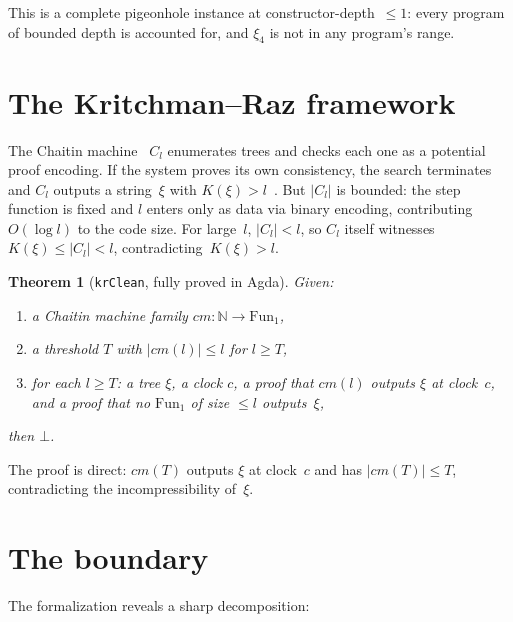 \documentclass[11pt]{article}
\newtheorem{theorem}{Theorem}
\begin{document}
This is a complete pigeonhole instance at constructor-depth~$\le 1$:
every program of bounded depth is accounted for,
and $\xi_4$ is not in any program's range.

\section{The Kritchman--Raz framework}

The Chaitin machine~\cite{chaitin1974} $C_l$ enumerates trees and
checks each one as a potential proof encoding.
If the system proves its own consistency, the search terminates
and $C_l$ outputs a string~$\xi$ with
$K(\xi) > l$~\cite{kolmogorov1965}.
But $|C_l|$ is bounded: the step function is fixed and $l$ enters
only as data via binary encoding, contributing $O(\log l)$ to the
code size.
For large~$l$, $|C_l| < l$, so $C_l$ itself witnesses
$K(\xi) \le |C_l| < l$, contradicting~$K(\xi) > l$.

\begin{theorem}[\texttt{krClean}, fully proved in Agda]
  Given:
  \begin{enumerate}[nosep]
    \item a Chaitin machine family
          $\mathit{cm} : \mathbb{N} \to \mathrm{Fun}_1$,
    \item a threshold $T$ with $|\mathit{cm}(l)| \le l$
          for $l \ge T$,
    \item for each $l \ge T$: a tree $\xi$, a clock $c$,
          a proof that $\mathit{cm}(l)$ outputs $\xi$ at clock~$c$,
          and a proof that no $\mathrm{Fun}_1$ of size $\le l$
          outputs~$\xi$,
  \end{enumerate}
  then $\bot$.
\end{theorem}

\noindent
The proof is direct: $\mathit{cm}(T)$ outputs $\xi$ at clock~$c$
and has $|\mathit{cm}(T)| \le T$, contradicting the
incompressibility of~$\xi$.

\section{The boundary}

The formalization reveals a sharp decomposition:
\end{document}
